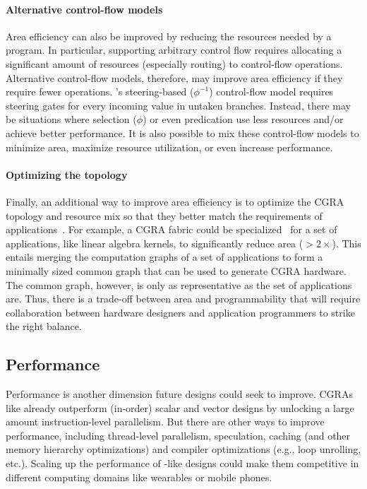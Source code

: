 \paragraph{Alternative control-flow models}
Area efficiency can also be improved by reducing the resources needed by a program.
% 
In particular, supporting arbitrary control flow requires allocating a significant amount of resources (especially routing) to control-flow operations.
% 
Alternative control-flow models, therefore, may improve area efficiency if they require fewer operations.
% 
\riptide's steering-based ($\phi^{-1}$) control-flow model requires steering gates for every incoming value in untaken branches.
% 
Instead, there may be situations where selection ($\phi$) or even predication use less resources and/or achieve better performance.
% 
It is also possible to mix these control-flow models to minimize area, maximize resource utilization, or even increase performance.

\paragraph{Optimizing the topology}
Finally, an additional way to improve area efficiency is to optimize the CGRA topology and resource mix so that they better match the requirements of applications~\cite{revamp,melchert2021automated}.
% 
For example, a CGRA fabric could be specialized~\cite{weng2020dsagen} for a set of applications, like linear algebra kernels, to significantly reduce area ($>2\times$).
% 
This entails merging the computation graphs of a set of applications to form a minimally sized common graph that can be used to generate CGRA hardware.
% 
The common graph, however, is only as representative as the set of applications are.
% 
Thus, there is a trade-off between area and programmability that will require collaboration between hardware designers and application programmers to strike the right balance.

\subsection{Performance}
Performance is another dimension future designs could seek to improve.
% 
CGRAs like \riptide already outperform (in-order) scalar and vector designs by unlocking a large amount instruction-level parallelism.
% 
But there are other ways to improve performance, including thread-level parallelism, speculation, caching (and other memory hierarchy optimizations) and compiler optimizations (e.g., loop unrolling, etc.).
% 
Scaling up the performance of \riptide-like designs could make them competitive in different computing domains like wearables or mobile phones.

